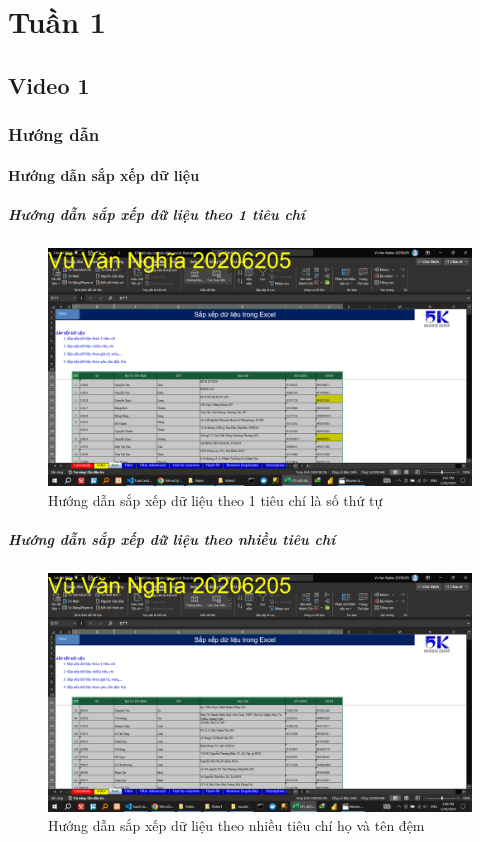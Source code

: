 \documentclass{article}
\begin{document}
\tableofcontents
\newpage
\section{Tuần 1}



\subsection{Video 1}

\subsubsection{Hướng dẫn}
\paragraph{Hướng dẫn sắp xếp dữ liệu}

\subparagraph{Hướng dẫn sắp xếp dữ liệu theo 1 tiêu chí}
\begin{figure}[h]
    \centering
    \includegraphics[scale = 0.15]{Video1/HuongDan/1.png}
    \caption{Hướng dẫn sắp xếp dữ liệu theo 1 tiêu chí là số thứ tự}
\end{figure}

\subparagraph{Hướng dẫn sắp xếp dữ liệu theo nhiều tiêu chí}
\begin{figure}[h]
    \centering
    \includegraphics[scale = 0.15]{Video1/HuongDan/2.png}
    \caption{Hướng dẫn sắp xếp dữ liệu theo  nhiều tiêu chí họ và tên đệm}
\end{figure}
\end{document}
